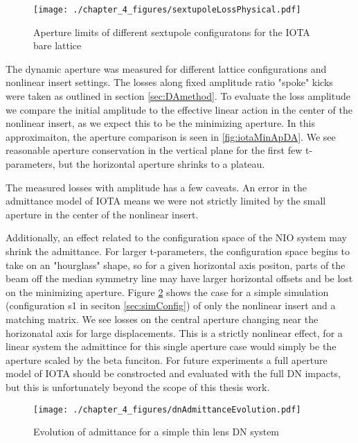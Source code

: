 \begin{figure}
	\centering
	\texttt{[image: ./chapter\_4\_figures/sextupoleLossPhysical.pdf]}
	\caption{Aperture limits of different sextupole configuratons for the IOTA bare lattice}
	\label{fig:bareDA}
\end{figure}

The dynamic aperture was measured for different lattice configurations and nonlinear insert settings. The losses along fixed amplitude ratio "spoke" kicks were taken as outlined in section \ref{sec:DAmethod}. To evaluate the loss amplitude we compare the initial amplitude to the effective linear action in the center of the nonlinear insert, as we expect this to be the minimizing aperture. In this approximaiton, the aperture comparison is seen in \ref{fig:iotaMinApDA}. We see reasonable aperture conservation in the vertical plane for the first few t-parameters, but the horizontal aperture shrinks to a plateau.

The measured losses with amplitude has a few caveats. An error in the admittance model of IOTA means we were not strictly limited by the small aperture in the center of the nonlinear insert.

Additionally, an effect related to the configuration space of the NIO system may shrink the admittance. For larger t-parameters, the configuration space begins to take on an "hourglass" shape, so for a given horizontal axis positon, parts of the beam off the median symmetry line may have larger horizontal offsets and be lost on the minimizing aperture. Figure \ref{fig:dnAdmitEvolve} shows the case for a simple simulation (configuration s1 in seciton \ref{sec:simConfig}) of only the nonlinear insert and a matching matrix. We see losses on the central aperture changing near the horizonatal axis for large displacements. This is a strictly nonlinear effect, for a linear system the admittince for this single aperture case would simply be the aperture scaled by the beta funciton. For future experiments a full aperture model of IOTA should be constrocted and evaluated with the full DN impacts, but this is unfortunately beyond the scope of this thesis work.

\begin{figure}
	\centering
	\texttt{[image: ./chapter\_4\_figures/dnAdmittanceEvolution.pdf]}
	\caption{Evolution of admittance for a simple thin lens DN system}
	\label{fig:dnAdmitEvolve}
\end{figure}


